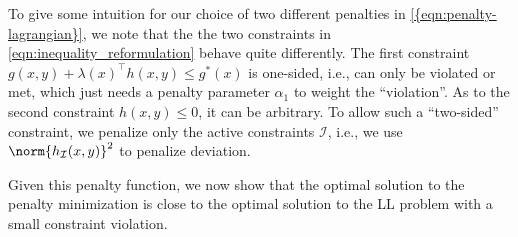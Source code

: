 
 To give some intuition for our choice of two different penalties in \cref{{eqn:penalty-lagrangian}}, we note that the the two constraints in \cref{eqn:inequality_reformulation} behave quite differently.
The first constraint $g(x,y) + \lambda(x)^\top h(x, y) \leq g^*(x)$ is one-sided, i.e., can only be violated or met, which just needs a penalty parameter $\alpha_1$ to weight the ``violation''.
As to the second constraint $h(x,y) \leq 0$, it can be arbitrary. To allow such a ``two-sided'' constraint, we penalize only the active constraints $\mathcal{I}$, i.e., we use $\norm{h_{\mathcal{I}}(x,y)}^2$ to penalize deviation.

Given this penalty function, we now show that the optimal solution to the penalty minimization is close to the optimal solution to the LL problem with a small constraint violation.







